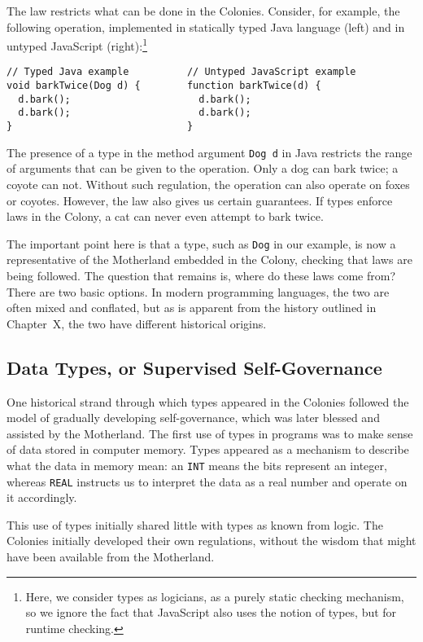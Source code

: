 \documentclass[]{article}
\begin{document}
The law restricts what can be done in the Colonies. Consider, for example, the following operation, implemented in statically typed Java language (left) and in untyped JavaScript (right):\footnote{Here, we consider types as logicians, as a purely static checking mechanism, so we ignore the fact that JavaScript also uses the notion of types, but for runtime checking.}

\begin{verbatim}
// Typed Java example          // Untyped JavaScript example
void barkTwice(Dog d) {        function barkTwice(d) {
  d.bark();                      d.bark();
  d.bark();                      d.bark();
}                              }
\end{verbatim}

The presence of a type in the method argument \texttt{Dog d} in Java restricts the range of  arguments that can be given to the operation. Only a dog can bark twice; a coyote can not. Without such regulation, the operation can also operate on foxes or coyotes. However, the law also gives us certain guarantees. If types enforce laws in the Colony, a cat can never even attempt to bark twice.

The important point here is that a type, such as \texttt{Dog} in our example, is now a representative of the Motherland embedded in the Colony, checking that laws are being followed. The question that remains is, where do these laws come from? There are two basic options. In modern programming languages, the two are often mixed and conflated, but as is apparent from the history outlined in Chapter~X, the two have different historical origins.

\subsection{Data Types, or Supervised Self-Governance}

One historical strand through which types appeared in the Colonies followed the model of gradually developing self-governance, which was later blessed and assisted by the Motherland. The first use of types in programs was to make sense of data stored in computer memory. Types appeared as a mechanism to describe what the data in memory mean: an \texttt{INT} means the bits represent an integer, whereas \texttt{REAL} instructs us to interpret the data as a real number and operate on it accordingly.

This use of types initially shared little with types as known from logic. The Colonies initially developed their own regulations, without the wisdom that might have been available from the Motherland.
\end{document}
